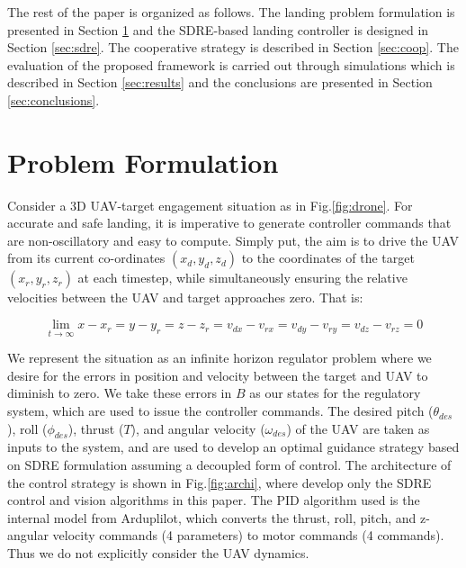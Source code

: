 \documentclass[conf]{new-aiaa}
\begin{document}
The rest of the paper is organized as follows. The landing problem formulation is presented in Section \ref{sec:pf} and the SDRE-based landing controller is designed in Section  \ref{sec:sdre}. The cooperative strategy is described in Section \ref{sec:coop}. The evaluation of the proposed framework is carried out through simulations which is described in Section \ref{sec:results} and the conclusions are presented in Section \ref{sec:conclusions}.




\section{Problem Formulation}\label{sec:pf}
Consider a 3D UAV-target engagement situation as in Fig.\ref{fig:drone}. For accurate and safe landing, it is imperative to generate controller commands that are non-oscillatory and easy to compute. Simply put, the aim is to drive the UAV from its current co-ordinates $(x_{d},y_{d},z_{d})$ to the coordinates of the target $(x_{r}, y_{r}, z_{r})$ at each timestep, while simultaneously ensuring the relative velocities between the UAV and target approaches zero. That is:

\begin{equation}
\lim_{t\to \infty} x-x_{r} = y-y_{r} = z-z_{r} = v_{dx}-v_{rx} = v_{dy}-v_{ry} = v_{dz}-v_{rz} = 0 
\end{equation}

We represent the situation as an infinite horizon regulator problem where we desire for the errors in position and velocity between the target and UAV to diminish to zero. We take these errors in $B$ as our states for the regulatory system, which are used to issue the controller commands. The desired pitch ($\theta_{des}$), roll ($\phi_{des}$), thrust ($T$), and angular velocity ($\omega_{des}$) of the UAV are taken as inputs to the system, and are used to develop an optimal guidance strategy based on SDRE formulation assuming a decoupled form of control. The architecture of the control strategy is shown in Fig.\ref{fig:archi}, where develop only the SDRE control and vision algorithms in this paper. The PID algorithm used is the internal model from Arduplilot, which converts the thrust, roll, pitch, and z-angular velocity commands (4 parameters) to motor commands (4 commands). Thus we do not explicitly consider the UAV dynamics. 
\end{document}

